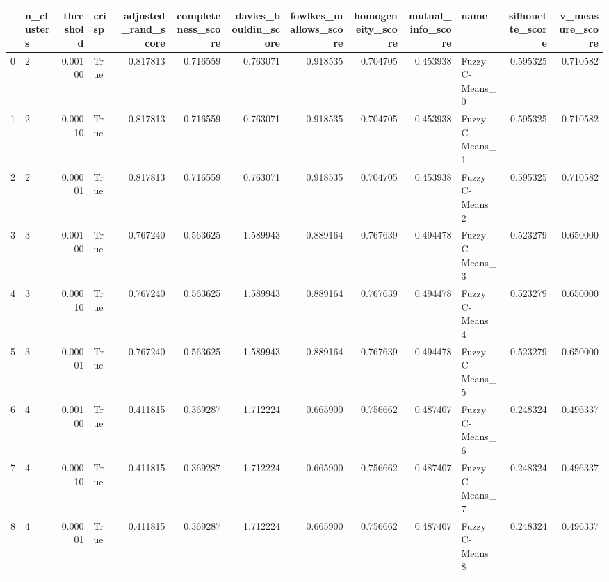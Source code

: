 \begin{tabular}{llrlrrrrrrlrr}
\toprule
{} & n\_clusters &  threshold & crisp &  adjusted\_rand\_score &  completeness\_score &  davies\_bouldin\_score &  fowlkes\_mallows\_score &  homogeneity\_score &  mutual\_info\_score &              name &  silhouette\_score &  v\_measure\_score \\
\midrule
0  &          2 &    0.00100 &  True &             0.817813 &            0.716559 &              0.763071 &               0.918535 &           0.704705 &           0.453938 &   Fuzzy C-Means\_0 &          0.595325 &         0.710582 \\
1  &          2 &    0.00010 &  True &             0.817813 &            0.716559 &              0.763071 &               0.918535 &           0.704705 &           0.453938 &   Fuzzy C-Means\_1 &          0.595325 &         0.710582 \\
2  &          2 &    0.00001 &  True &             0.817813 &            0.716559 &              0.763071 &               0.918535 &           0.704705 &           0.453938 &   Fuzzy C-Means\_2 &          0.595325 &         0.710582 \\
3  &          3 &    0.00100 &  True &             0.767240 &            0.563625 &              1.589943 &               0.889164 &           0.767639 &           0.494478 &   Fuzzy C-Means\_3 &          0.523279 &         0.650000 \\
4  &          3 &    0.00010 &  True &             0.767240 &            0.563625 &              1.589943 &               0.889164 &           0.767639 &           0.494478 &   Fuzzy C-Means\_4 &          0.523279 &         0.650000 \\
5  &          3 &    0.00001 &  True &             0.767240 &            0.563625 &              1.589943 &               0.889164 &           0.767639 &           0.494478 &   Fuzzy C-Means\_5 &          0.523279 &         0.650000 \\
6  &          4 &    0.00100 &  True &             0.411815 &            0.369287 &              1.712224 &               0.665900 &           0.756662 &           0.487407 &   Fuzzy C-Means\_6 &          0.248324 &         0.496337 \\
7  &          4 &    0.00010 &  True &             0.411815 &            0.369287 &              1.712224 &               0.665900 &           0.756662 &           0.487407 &   Fuzzy C-Means\_7 &          0.248324 &         0.496337 \\
8  &          4 &    0.00001 &  True &             0.411815 &            0.369287 &              1.712224 &               0.665900 &           0.756662 &           0.487407 &   Fuzzy C-Means\_8 &          0.248324 &         0.496337 \\

\end{tabular}
